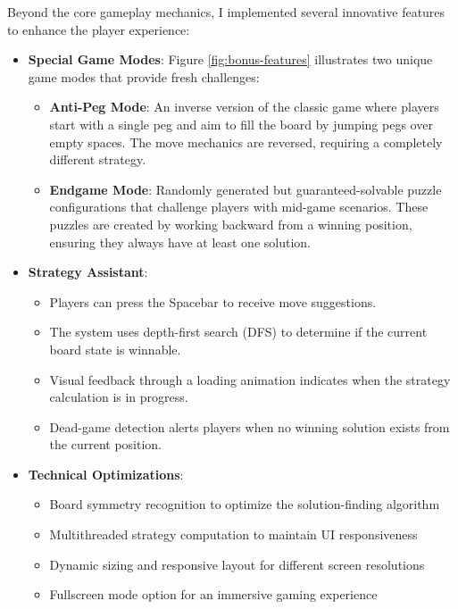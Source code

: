 Beyond the core gameplay mechanics, I implemented several innovative features to enhance the player experience:

\begin{itemize}
    \item \textbf{Special Game Modes}:
    Figure \ref{fig:bonus-features} illustrates two unique game modes that provide fresh challenges:
    \begin{itemize}
        \item \textbf{Anti-Peg Mode}: An inverse version of the classic game where players start with a single peg and aim to fill the board by jumping pegs over empty spaces. The move mechanics are reversed, requiring a completely different strategy.
        
        \item \textbf{Endgame Mode}: Randomly generated but guaranteed-solvable puzzle configurations that challenge players with mid-game scenarios. These puzzles are created by working backward from a winning position, ensuring they always have at least one solution.
    \end{itemize}
    
    \item \textbf{Strategy Assistant}:
    \begin{itemize}
        \item Players can press the Spacebar to receive move suggestions.
        \item The system uses depth-first search (DFS) to determine if the current board state is winnable.
        \item Visual feedback through a loading animation indicates when the strategy calculation is in progress.
        \item Dead-game detection alerts players when no winning solution exists from the current position.
    \end{itemize}
    
    \item \textbf{Technical Optimizations}:
    \begin{itemize}
        \item Board symmetry recognition to optimize the solution-finding algorithm
        \item Multithreaded strategy computation to maintain UI responsiveness
        \item Dynamic sizing and responsive layout for different screen resolutions
        \item Fullscreen mode option for an immersive gaming experience
    \end{itemize}
\end{itemize}